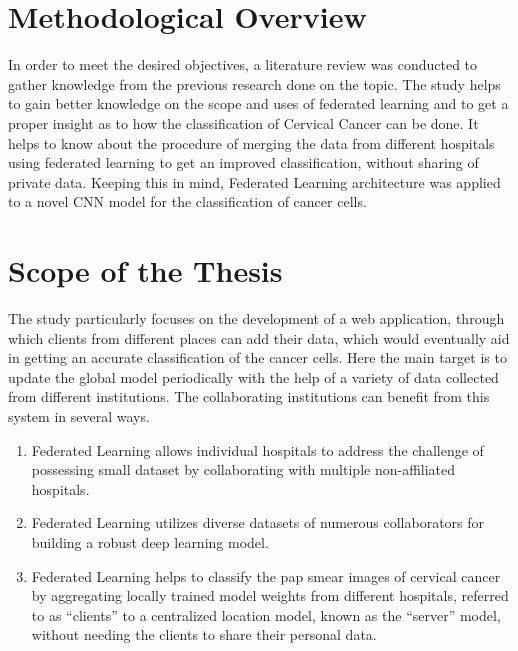 \section{Methodological Overview}
In order to meet the desired objectives, a literature review was conducted to gather knowledge from the previous research done on the topic. The study helps to gain better knowledge on the scope and uses of federated learning and to get a proper insight as to how the classification of Cervical Cancer can be done. It helps to know about the procedure of merging the data from different hospitals using federated learning to get an improved classification, without sharing of private data. Keeping this in mind, Federated Learning architecture was applied to a novel CNN model for the classification of cancer cells.

\section{Scope of the Thesis}
The study particularly focuses on the development of a web application, through which clients from different places can add their data, which would eventually aid in getting an accurate classification of the cancer cells. Here the main target is to update the global model periodically with the help of a variety of data collected from different institutions. The collaborating institutions can benefit from this system in several ways. 
\begin{enumerate}
    \item 
Federated Learning allows individual hospitals to address the challenge of possessing small dataset by collaborating with multiple non-affiliated hospitals. 
    \item 
Federated Learning utilizes diverse datasets of numerous collaborators for building a robust deep learning model.
    \item 
Federated Learning helps to classify the pap smear images of cervical cancer by aggregating locally trained model weights from different hospitals, referred to as “clients” to a centralized location model, known as the “server” model, without needing the clients to share their personal data. 

\end{enumerate}




